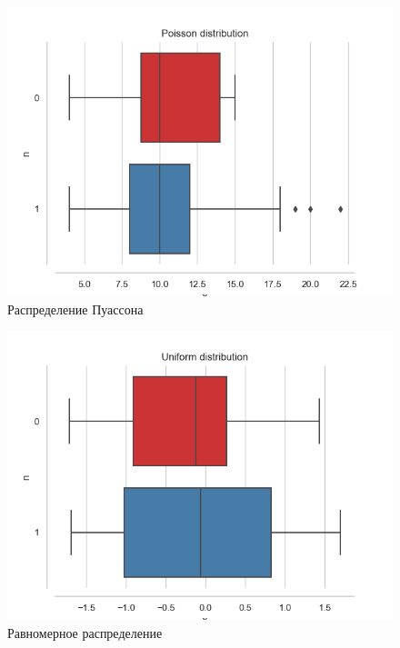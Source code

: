 \documentclass[12pt,a4paper]{article}
\begin{document}
\begin{figure}[H]
    \centering
    \includegraphics[scale=0.8]{images/poisson.png}
    \caption{Распределение Пуассона}
    \label{fig:poisson}
\end{figure}

\begin{figure}[H]
    \centering
    \includegraphics[scale=0.8]{images/uniform.png}
    \caption{Равномерное распределение}
    \label{fig:uniform}
\end{figure}
\end{document}
